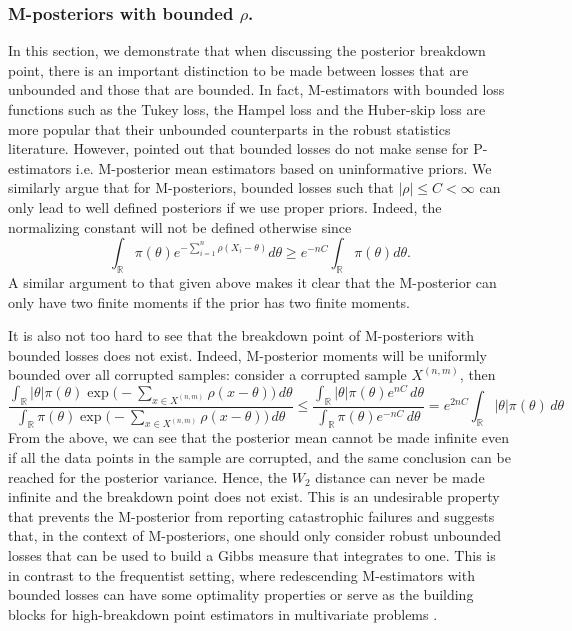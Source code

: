 \documentclass[11pt, oneside]{amsart}
\theoremstyle{definition}   %
\newcommand{\R}{\mathbb{R}}
\newcommand{\loss}{\rho}
\newcommand{\corruptedsample}{X^{(n,m)}}
\begin{document}
\subsubsection{M-posteriors with bounded $\rho$.}
In this section, we demonstrate that when discussing the posterior breakdown point, there is an important distinction to be made between losses  that are unbounded and those that are bounded. In fact,
M-estimators with bounded loss functions such as the Tukey loss, the Hampel loss and the Huber-skip loss are more popular that their unbounded counterparts in the robust statistics literature.  However, \cite{huber1984} pointed out that bounded losses do not make sense for P-estimators i.e. M-posterior mean estimators based on uninformative priors. We similarly argue that for M-posteriors, bounded losses such that $|\rho|
\leq C<\infty$ can only lead to well defined posteriors if we use proper priors. 
Indeed, the normalizing constant will not be defined otherwise since 
%
\begin{equation*}
    \int_{\mathbb{R}} \pi(\theta) e^{-\sum_{i=1}^n\rho(X_i-\theta)}d\theta\geq e^{-nC}\int_{\mathbb{R}} \pi(\theta) d\theta.
\end{equation*}
%
A similar argument to that given above makes it clear that the M-posterior can only have two finite moments if the prior has two finite moments.


It is also not too hard to see that the breakdown point of M-posteriors with bounded losses does not exist. Indeed, M-posterior moments will be uniformly bounded over all corrupted samples: consider a corrupted sample \( \corruptedsample\), then
%
\[
    \frac{\int_\R |\theta| \pi(\theta)  \exp \bigl (-\sum_{x \in \corruptedsample} \loss(x - \theta) \bigr ) \, d \theta} {\int_\R \pi(\theta) \exp \bigl (-\sum_{x \in \corruptedsample} \loss(x - \theta) \bigr ) \, d \theta}
    \leq
    \frac{\int_\R |\theta| \pi(\theta)  e ^ {nC} \, d\theta}{\int_\R \pi(\theta) e ^ {-nC} \, d\theta} 
    =
    e ^ {2nC} \int_\R |\theta| \pi(\theta)  \, d\theta
\]
%
From the above, we can see that the posterior mean cannot be made infinite even if all the data points in the sample are corrupted, and the same conclusion can be reached for the posterior variance. Hence, the $W_2$ distance can never be made infinite and the breakdown point does not exist. This is an undesirable property that prevents the  M-posterior from reporting catastrophic failures and suggests that, in the context of M-posteriors, one should only consider robust unbounded losses that can be used to build a Gibbs measure that integrates to one. This is in contrast to the frequentist setting, where redescending M-estimators with bounded losses can have some optimality properties \citep{hampel:rousseeuw:ronchetti1981} or serve as the building blocks for high-breakdown point estimators in multivariate problems \citep{rousseeuw:yohai1984, yohai1987, davies1987,lopuhaa:rousseeuw1991}.
\end{document}
